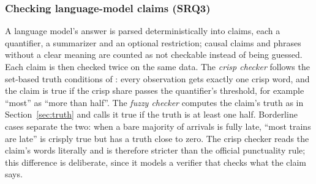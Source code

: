 \subsubsection*{Checking language-model claims (SRQ3)} A language model's answer is parsed
deterministically into claims, each a quantifier, a summarizer and an optional restriction;
causal claims and phrases without a clear meaning are counted as not checkable instead of
being guessed. Each claim is then checked twice on the same data. The \emph{crisp checker}
follows the set-based truth conditions of \citet{eida2026}: every observation gets exactly
one crisp word, and the claim is true if the crisp share passes the quantifier's threshold,
for example ``most'' as ``more than half''. The \emph{fuzzy checker} computes the claim's
truth as in Section~\ref{sec:truth} and calls it true if the truth is at least one half.
Borderline cases separate the two: when a bare majority of arrivals is fully late, ``most
trains are late'' is crisply true but has a truth close to zero. The crisp checker reads the
claim's words literally and is therefore stricter than the official punctuality rule; this
difference is deliberate, since it models a verifier that checks what the claim says.

